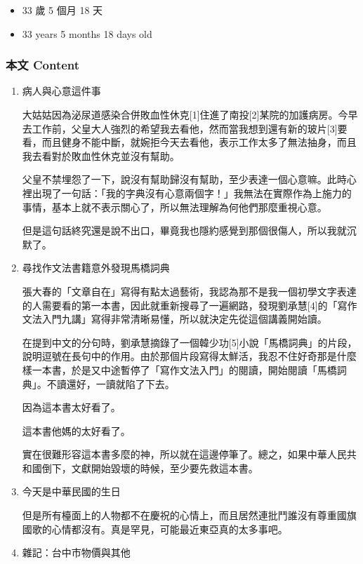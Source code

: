 \documentclass[a5paper, 12pt
]{book}
\providecommand{\tightlist}{%
  \setlength{\itemsep}{0pt}\setlength{\parskip}{0pt}}
\begin{document}
\begin{itemize}
\tightlist
\item
  33 歲 5 個月 18 天
\item
  33 years 5 months 18 days old
\end{itemize}

\hypertarget{ux672cux6587-content-9}{%
\subsubsection{本文 Content}\label{ux672cux6587-content-9}}

\begin{enumerate}
\def\labelenumi{\arabic{enumi}.}
\item
  病人與心意這件事

  大姑姑因為泌尿道感染合併敗血性休克{[}1{]}住進了南投{[}2{]}某院的加護病房。今早去工作前，父皇大人強烈的希望我去看他，然而當我想到還有新的玻片{[}3{]}要看，而且健身不能中斷，就婉拒今天去看他，表示工作太多了無法抽身，而且我去看對於敗血性休克並沒有幫助。

  父皇不禁埋怨了一下，說沒有幫助歸沒有幫助，至少表達一個心意嘛。此時心裡出現了一句話：「我的字典沒有心意兩個字！」我無法在實際作為上施力的事情，基本上就不表示關心了，所以無法理解為何他們那麼重視心意。

  但是這句話終究還是說不出口，畢竟我也隱約感覺到那個很傷人，所以我就沉默了。
\item
  尋找作文法書籍意外發現馬橋詞典

  張大春的「文章自在」寫得有點太過藝術，我認為那不是我一個初學文字表達的人需要看的第一本書，因此就重新搜尋了一遍網路，發現劉承慧{[}4{]}的「寫作文法入門九講」寫得非常清晰易懂，所以就決定先從這個講義開始讀。

  在提到中文的分句時，劉承慧摘錄了一個韓少功{[}5{]}小說「馬橋詞典」的片段，說明逗號在長句中的作用。由於那個片段寫得太鮮活，我忍不住好奇那是什麼樣一本書，於是又中途暫停了「寫作文法入門」的閱讀，開始閱讀「馬橋詞典」。不讀還好，一讀就陷了下去。

  因為這本書太好看了。

  這本書他媽的太好看了。

  實在很難形容這本書多麼的神，所以就在這邊停筆了。總之，如果中華人民共和國倒下，文獻開始毀壞的時候，至少要先救這本書。
\item
  今天是中華民國的生日

  但是所有檯面上的人物都不在慶祝的心情上，而且居然連批鬥誰沒有尊重國旗國歌的心情都沒有。真是罕見，可能最近東亞真的太多事吧。
\item
  雜記：台中市物價與其他


\end{enumerate}
\end{document}
